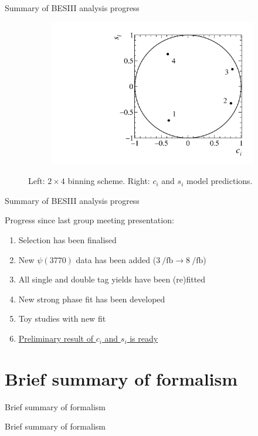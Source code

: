 \documentclass{beamer}
\begin{document}
\begin{frame}{Summary of BESIII analysis progress}
\begin{figure}
\begin{subfigure}{0.30\textwidth}
      \includegraphics[width = 1.0\textwidth]{Plots/StrongPhaseParametersPlot_cisi_4Bins.pdf}
    \end{subfigure}
    \caption{Left: $2\times4$ binning scheme. Right: $c_i$ and $s_i$ model predictions.}
  \end{figure}
\end{frame}

\begin{frame}{Summary of BESIII analysis progress}
  \begin{center}
    \Large{Progress since last group meeting presentation:}
  \end{center}
  \vspace{0.5cm}
  \begin{enumerate}
    \setlength\itemsep{0.5em}
    \item{Selection has been finalised}
    \item{New $\psi(3770)$ data has been added ($\SI{3}{\per\femto\barn}\to\SI{8}{\per\femto\barn}$)}
    \item{All single and double tag yields have been (re)fitted}
    \item{New strong phase fit has been developed}
    \item{Toy studies with new fit}
    \item{\underline{Preliminary result of $c_i$ and $s_i$ is ready}}
  \end{enumerate}
\end{frame}

\section{Brief summary of formalism}
\begin{frame}{Brief summary of formalism}
  \begin{center}
    {\huge Brief summary of formalism}
  \end{center}
\end{frame}
\end{document}
